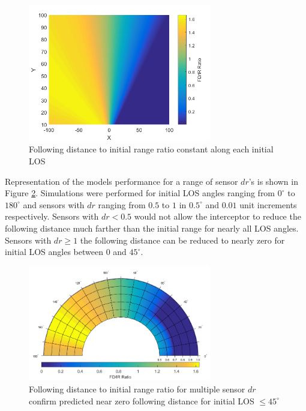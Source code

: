 \documentclass[conference]{IEEEtran}
\begin{document}




\begin{figure}[H]
	\centering
	\includegraphics[width=8cm]{FDIR_Rays.png}
	\caption{Following distance to initial range ratio constant along each initial LOS}
	\label{fig:Rays}
\end{figure}

Representation of the models performance for a range of sensor $dr$'s is shown in Figure \ref{fig:Polar}. Simulations were performed for initial LOS angles ranging from $0^{\circ}$ to $180^{\circ}$ and sensors with $dr$ ranging from $0.5$ to $1$ in $0.5^{\circ}$ and $0.01$ unit increments respectively. Sensors with $dr < 0.5$ would not allow the interceptor to reduce the following distance much farther than the initial range for nearly all LOS angles. Sensors with $dr \geq 1$ the following distance can be reduced to nearly zero for initial LOS angles between $0$ and $45^{\circ}$. 

\begin{figure}[H]
	\centering
	\includegraphics[width=8cm]{correctpolar.png}
	\caption{Following distance to initial range ratio for multiple sensor $dr$ confirm predicted near zero following distance for initial LOS $\leq45^\circ$}
	\label{fig:Polar}
\end{figure}
\end{document}
